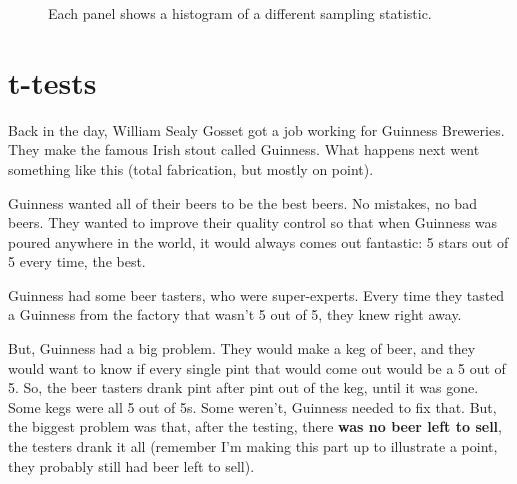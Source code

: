 \documentclass[
  letterpaper,
  DIV=11,
  numbers=noendperiod]{scrreprt}
\begin{document}
\begin{figure}


\caption{\label{fig-5.5cohensD}Each panel shows a histogram of a
different sampling statistic.}

\end{figure}%


\chapter{t-tests}\label{t-tests}

Back in the day, William Sealy Gosset got a job working for Guinness
Breweries. They make the famous Irish stout called Guinness. What
happens next went something like this (total fabrication, but mostly on
point).

Guinness wanted all of their beers to be the best beers. No mistakes, no
bad beers. They wanted to improve their quality control so that when
Guinness was poured anywhere in the world, it would always comes out
fantastic: 5 stars out of 5 every time, the best.

Guinness had some beer tasters, who were super-experts. Every time they
tasted a Guinness from the factory that wasn't 5 out of 5, they knew
right away.

But, Guinness had a big problem. They would make a keg of beer, and they
would want to know if every single pint that would come out would be a 5
out of 5. So, the beer tasters drank pint after pint out of the keg,
until it was gone. Some kegs were all 5 out of 5s. Some weren't,
Guinness needed to fix that. But, the biggest problem was that, after
the testing, there \textbf{was no beer left to sell}, the testers drank
it all (remember I'm making this part up to illustrate a point, they
probably still had beer left to sell).
\end{document}
